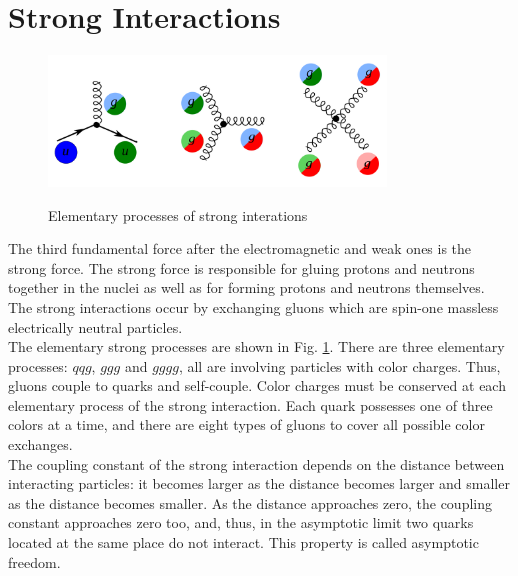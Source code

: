 \section{Strong Interactions}
\label{sec:Intro_QCD}

\begin{figure}[htb]
  \begin{center}
    {\includegraphics[width=0.80\textwidth]{../figs/Intro/feynmStrong.png}}
    \caption{Elementary processes of strong interations}
    \label{fig:feynmStrong}
  \end{center}
\end{figure}

The third fundamental force after the electromagnetic and weak ones is the strong force. The strong force is responsible for gluing protons and neutrons together in the nuclei as well as for forming protons and neutrons themselves. The strong interactions occur by exchanging gluons which are spin-one massless electrically neutral particles.  \\
The elementary strong processes are shown in Fig. \ref{fig:feynmStrong}. There are three elementary processes: $qqg$, $ggg$ and $gggg$, all are involving particles with color charges. Thus, gluons couple to quarks and self-couple. Color charges must be conserved at each elementary process of the strong interaction. Each quark possesses one of three colors at a time, and there are eight types of gluons to cover all possible color exchanges. \\
The coupling constant of the strong interaction depends on the distance between interacting particles: it becomes larger as the distance becomes larger and smaller as the distance becomes smaller. As the distance approaches zero, the coupling constant approaches zero too, and, thus, in the asymptotic limit two quarks located at the same place do not interact. This property is called asymptotic freedom.\\

